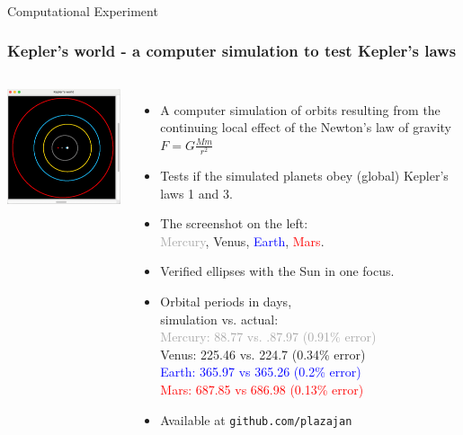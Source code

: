 \documentclass[aspectratio=169,xcolor=pdftex,dvipsnames]{beamer} %
\begin{document}


\begin{frame}
\frametitle{}

\begin{center}
\Huge{Computational Experiment}
\end{center}

\end{frame}

\begin{frame}
\frametitle{Kepler's world - a computer simulation to test Kepler's laws}



\begin{columns}
      \includegraphics[width=70mm]{keplersWorld.png}
   

\begin{itemize}
\item
A computer simulation of orbits resulting from the continuing local effect of the Newton's law of gravity $F = G\frac{M m}{r^2}$
\item
Tests if the simulated planets obey (global) Kepler's laws 1 and 3.
\item 
The screenshot on the left:\\ \textcolor{darkgray}{Mercury}, \textcolor{YellowOrange}{Venus}, 
\textcolor{blue}{Earth}, \textcolor{red}{Mars}.
\item
Verified ellipses with the Sun in one focus.
\item
Orbital periods in days,\\ simulation vs. actual:\\
\textcolor{darkgray}{Mercury: 88.77 vs. .87.97 (0.91\% error)}\\
\textcolor{YellowOrange}{Venus: 225.46 vs. 224.7 (0.34\% error)}\\
\textcolor{blue}{Earth: 365.97 vs 365.26 (0.2\% error)}\\
\textcolor{red}{Mars: 687.85 vs 686.98 (0.13\% error)}
\item
Available at \texttt{github.com/plazajan}
\end{itemize}
\end{columns} 

\end{frame}
\end{document}
